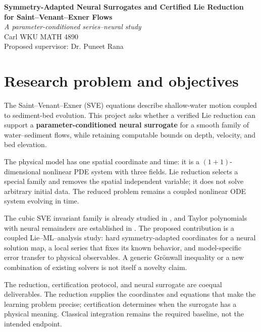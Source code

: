 \documentclass[12pt,a4paper]{article}
\begin{document}
\begin{center}
\textbf{Symmetry-Adapted Neural Surrogates and Certified Lie Reduction}\\
\textbf{for Saint--Venant--Exner Flows}\\
\textit{A parameter-conditioned series--neural study}\\
Carl \quad WKU MATH 4890\\
Proposed supervisor: Dr. Puneet Rana
\end{center}
\section{Research problem and objectives}
The Saint--Venant--Exner (SVE) equations describe shallow-water motion coupled to sediment-bed evolution. This project asks whether a verified Lie reduction can support a \textbf{parameter-conditioned neural surrogate} for a smooth family of water--sediment flows, while retaining computable bounds on depth, velocity, and bed elevation.

The physical model has one spatial coordinate and time: it is a $(1+1)$-dimensional nonlinear PDE system with three fields. Lie reduction selects a special family and removes the spatial independent variable; it does not solve arbitrary initial data. The reduced problem remains a coupled nonlinear ODE system evolving in time.

The cubic SVE invariant family is already studied in \cite{sve2022}, and Taylor polynomials with neural remainders are established in \cite{taylor}. The proposed contribution is a coupled Lie--ML--analysis study: hard symmetry-adapted coordinates for a neural solution map, a local series that fixes its known behavior, and model-specific error transfer to physical observables. A generic Gr\"onwall inequality or a new combination of existing solvers is not itself a novelty claim.

The reduction, certification protocol, and neural surrogate are coequal deliverables. The reduction supplies the coordinates and equations that make the learning problem precise; certification determines when the surrogate has a physical meaning. Classical integration remains the required baseline, not the intended endpoint.
\newpage
\end{document}
